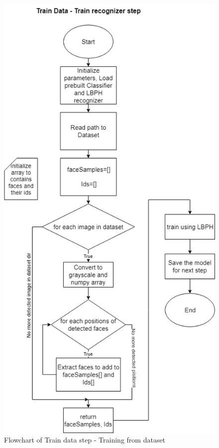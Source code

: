         \begin{figure}[!ht]
            \begin{center}
            \includegraphics[scale=0.64]{images/train.png}
            \caption{Flowchart of Train data step - Training from dataset}
            \label{fig:train}
            \end{center}
        \end{figure}
